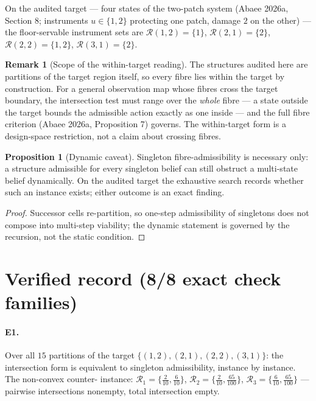 \documentclass[10pt,twocolumn]{article}
\theoremstyle{definition}
\newtheorem{proposition}{Proposition}
\newtheorem{remark}{Remark}
\begin{document}
On the audited target --- four states of the two-patch system (Abaee 2026a,
Section 8; instruments $u\in\{1,2\}$ protecting one patch, damage $2$ on
the other) --- the floor-servable instrument sets are
$\mathcal R(1,2)=\{1\}$, $\mathcal R(2,1)=\{2\}$,
$\mathcal R(2,2)=\{1,2\}$, $\mathcal R(3,1)=\{2\}$.

\begin{remark}[Scope of the within-target reading]
\label{rem:scope}
The structures audited here are partitions of the target region itself, so
every fibre lies within the target by construction. For a general
observation map whose fibres cross the target boundary, the intersection
test must range over the \emph{whole} fibre --- a state outside the target
bounds the admissible action exactly as one inside --- and the full fibre
criterion (Abaee 2026a, Proposition 7) governs. The within-target form is
a design-space restriction, not a claim about crossing fibres.
\end{remark}

\begin{proposition}[Dynamic caveat]
Singleton fibre-admissibility is necessary only: a structure admissible for
every singleton belief can still obstruct a multi-state belief
dynamically. On the audited target the exhaustive search records whether
such an instance exists; either outcome is an exact finding.
\end{proposition}
\begin{proof}
Successor cells re-partition, so one-step admissibility of singletons does
not compose into multi-step viability; the dynamic statement is governed by
the recursion, not the static condition.
\end{proof}

\section{Verified record (8/8 exact check families)}

\paragraph{E1.} Over all $15$ partitions of the target
$\{(1,2),(2,1),(2,2),(3,1)\}$: the intersection form is equivalent to
singleton admissibility, instance by instance. The non-convex counter-
instance: $\mathcal R_1=\{\tfrac2{10},\tfrac6{10}\}$,
$\mathcal R_2=\{\tfrac2{10},\tfrac{65}{100}\}$,
$\mathcal R_3=\{\tfrac6{10},\tfrac{65}{100}\}$ --- pairwise intersections
nonempty, total intersection empty.
\end{document}
